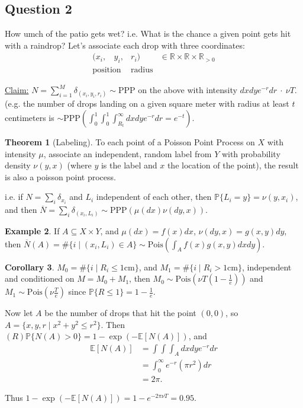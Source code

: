 \documentclass[12pt,letterpaper]{article}
\theoremstyle{definition}
\newtheorem{thm}{Theorem}[section]
\newtheorem{coro}[thm]{Corollary}
\newtheorem{exmp}[thm]{Example}
\begin{document}
\subsection{Question 2}

How umch of the patio gets wet? i.e. What is the chance a given point gets hit with a raindrop? Let's associate each drop with three coordinates: \[\begin{array}{cccc}
	(x_i,\ \ \ \  y_i, & r_i) & \in \mathbb{R} \times \mathbb{R}\times \mathbb{R}_{>0}\\
	\text{position} & \text{radius}
\end{array}\]

\underline{Claim:} $N = \sum_{i=1}^M \delta_{(x_i, y_i, r_i)} \sim \text{PPP}$ on the above with intensity $dxdye^{-r}dr ~\cdot~ \nu T$. (e.g. the number of drops landing on a given square meter with radius at least $t$ centimeters is $\sim \text{PPP}\left(\int_{0}^1 \int_0^1 \int_{R_t}^\infty dxdy e^{-r}dr = e^{-t}\right)$. 

\begin{thm}[Labeling]
	To each point of a Poisson Point Process on $X$ with intensity $\mu$, associate an independent, random  label from $Y$ with probability density $\nu(y,x)$ (where $y$ is the label and $x$ the location of the point), the result is also a poisson point process. 
	
	i.e. if $N = \sum_{i} \delta_{x_i}$ and $L_i$ independent of each other, then $\mathbb{P}\{L_i = y\} = \nu(y, x_i)$, and then $\overline{N} = \sum_{i} \delta_{(x_i, L_i)} \sim \text{PPP}(\mu(dx)\nu(dy,x))$. 
\end{thm}

\begin{exmp}
	If $A \subseteq X \times Y$, and $\mu(dx) = f(x) dx$, $\nu(dy, x) = g(x,y)dy$, then $\overline{N}(A) = \#\{i \mid (x_i, L_i) \in A\} \sim \text{Pois}\left(\int_A f(x) g(x,y) dxdy\right)$. 
\end{exmp}

\begin{coro}
	$M_0 = \#\{i \mid R_i \leq 1\text{cm}\}$, and $M_1 = \#\{i \mid R_i > 1\text{cm}\}$, independent and conditioned on $M = M_0 + M_1$, then $M_0 \sim \text{Pois}(\nu T(1-\frac{1}{e}))$ and $M_1 \sim \text{Pois}(\nu\frac{T}{e})$ since $\mathbb{P}\{R \leq 1\} = 1 - \frac{1}{e}$. 
\end{coro}

Now let $A$ be the number of drops that hit the point $(0,0)$, so $A = \{x,y,r \mid x^2 + y^2 \leq r^2\}$. Then $(R)\mathbb{P}\{N(A) > 0\} = 1-\exp(-\mathbb{E}[N(A)])$, and \begin{align*}
\mathbb{E}[N(A)] &= \int\int\int_A dxdye^{-r}dr \\
&= \int_0^\infty e^{-r}(\pi r^2) dr\\
&= 2\pi.
\end{align*}
	
	Thus $1 - \exp(-\mathbb{E}[N(A)]) = 1 - e^{-2\pi\nu T} = 0.95$. 
\end{document}
